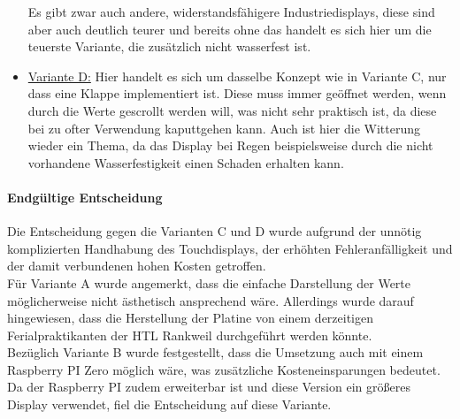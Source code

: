 \begin{itemize}
    Es gibt zwar auch andere, widerstandsfähigere Industriedisplays, diese sind aber auch deutlich teurer und bereits ohne das handelt es sich hier um die teuerste Variante, die zusätzlich nicht wasserfest ist.
	\item \underline{Variante D:} Hier handelt es sich um dasselbe Konzept wie in Variante C, nur dass eine Klappe implementiert ist. Diese muss immer geöffnet werden, wenn durch die Werte gescrollt werden will, was nicht sehr praktisch ist, da diese bei zu ofter Verwendung kaputtgehen kann. Auch ist hier die Witterung wieder ein Thema, da das Display bei Regen beispielsweise durch die nicht vorhandene Wasserfestigkeit einen Schaden erhalten kann.
\end{itemize}

\paragraph{Endgültige Entscheidung}
Die Entscheidung gegen die Varianten C und D wurde aufgrund der unnötig komplizierten Handhabung des Touchdisplays, der erhöhten Fehleranfälligkeit und der damit verbundenen hohen Kosten getroffen. \\
Für Variante A wurde angemerkt, dass die einfache Darstellung der Werte möglicherweise nicht ästhetisch ansprechend wäre. Allerdings wurde darauf hingewiesen, dass die Herstellung der Platine von einem derzeitigen Ferialpraktikanten der HTL Rankweil durchgeführt werden könnte. \\
Bezüglich Variante B wurde festgestellt, dass die Umsetzung auch mit einem Raspberry PI Zero möglich wäre, was zusätzliche Kosteneinsparungen bedeutet. Da der Raspberry PI zudem erweiterbar ist und diese Version ein größeres Display verwendet, fiel die Entscheidung auf diese Variante.
